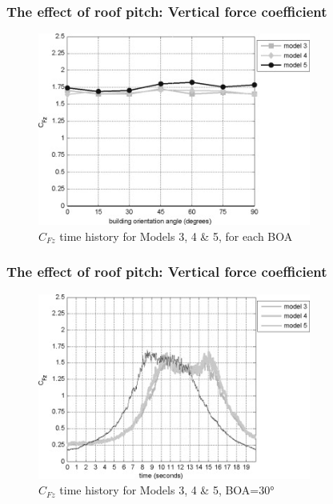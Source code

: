 \documentclass{beamer}
\begin{document}
\begin{frame}
	\frametitle{The effect of roof pitch: Vertical force coefficient}
	\begin{figure}
		\includegraphics[width=0.8\textwidth]{./fig/8.jpg}
		\caption{$C_{Fz}$ time history for Models 3, 4 \& 5, for each BOA}
	\end{figure}
\end{frame}

\begin{frame}
	\frametitle{The effect of roof pitch: Vertical force coefficient}
	\begin{figure}
			\includegraphics[width=0.8\textwidth]{./fig/9.jpg}
			\caption{$C_{Fz}$ time history for Models 3, 4 \& 5, BOA=\ang{30}}
		\end{figure}
\end{frame}
\end{document}
